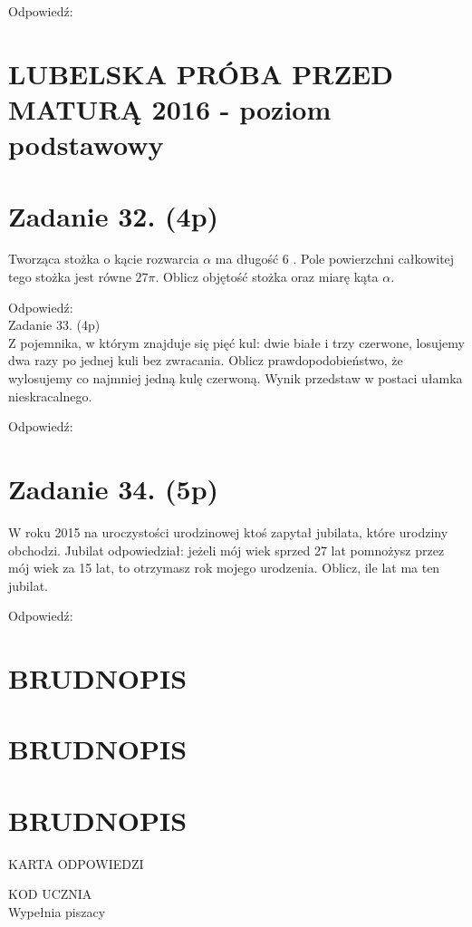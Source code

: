 \documentclass[10pt]{article}
\begin{document}
Odpowiedź:

\section*{LUBELSKA PRÓBA PRZED MATURĄ 2016 - poziom podstawowy}
\section*{Zadanie 32. (4p)}
Tworząca stożka o kącie rozwarcia \(\alpha\) ma długość 6 . Pole powierzchni całkowitej tego stożka jest równe \(27 \pi\). Oblicz objętość stożka oraz miarę kąta \(\alpha\).

Odpowiedź:\\
Zadanie 33. (4p)\\
Z pojemnika, w którym znajduje się pięć kul: dwie białe i trzy czerwone, losujemy dwa razy po jednej kuli bez zwracania. Oblicz prawdopodobieństwo, że wylosujemy co najmniej jedną kulę czerwoną. Wynik przedstaw w postaci ułamka nieskracalnego.

Odpowiedź:

\section*{Zadanie 34. (5p)}
W roku 2015 na uroczystości urodzinowej ktoś zapytał jubilata, które urodziny obchodzi. Jubilat odpowiedział: jeżeli mój wiek sprzed 27 lat pomnożysz przez mój wiek za 15 lat, to otrzymasz rok mojego urodzenia. Oblicz, ile lat ma ten jubilat.

Odpowiedź:

\section*{BRUDNOPIS}
\section*{BRUDNOPIS}
\section*{BRUDNOPIS}
KARTA ODPOWIEDZI

KOD UCZNIA \(\qquad\)\\
Wypełnia piszacy
\end{document}
